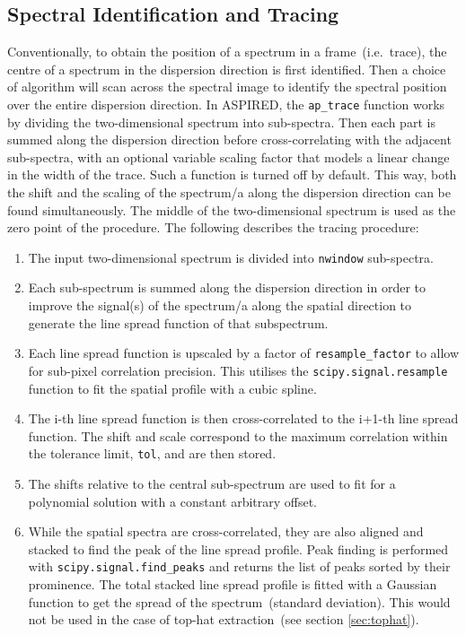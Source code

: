 \documentclass[linenumbers, twocolumn]{aastex631}
\begin{document}
\subsection{Spectral Identification and Tracing}
\label{sec:tracing}
Conventionally, to obtain the position of a spectrum in a frame~(i.e.\ trace),
the centre of a spectrum in the dispersion direction is first identified. Then
a choice of algorithm will scan across the spectral image to identify
the spectral position over the entire dispersion direction. In \textsc{ASPIRED},
the \texttt{ap\_trace} function works by dividing the two-dimensional spectrum
into sub-spectra. Then each part is summed along the dispersion direction
before cross-correlating with the adjacent sub-spectra, with an optional variable
scaling factor that models a linear change in the width of the trace. Such a
function is turned off by default. This way, both the shift and the scaling of
the spectrum/a along the dispersion direction can be found simultaneously. The
middle of the two-dimensional spectrum is used as the zero point of the
procedure. The following describes the tracing procedure:
\begin{enumerate}
    \item
        The input two-dimensional spectrum is divided into \texttt{nwindow}
        sub-spectra.
    \item
        Each sub-spectrum is summed along the dispersion direction
        in order to improve the signal(s) of the spectrum/a along
        the spatial direction to generate the line spread function
        of that subspectrum.
    \item
        Each line spread function is upscaled by a factor of
        \texttt{resample\_factor} to allow for sub-pixel correlation
        precision. This utilises the \texttt{scipy.signal.resample}
        function to fit the spatial profile with a cubic spline.
    \item
        The i-th line spread function is then cross-correlated to the i+1-th
        line spread function. The shift and scale correspond to the maximum
        correlation within the tolerance limit, \texttt{tol}, and are then stored.
    \item
        The shifts relative to the central sub-spectrum are used to
        fit for a polynomial solution with a constant arbitrary offset.
    \item
        While the spatial spectra are cross-correlated, they are also
        aligned and stacked to find the peak of the line spread profile.
        Peak finding is performed with \texttt{scipy.signal.find\_peaks}
        and returns the list of peaks sorted by their prominence. The
        total stacked line spread profile is fitted with a Gaussian
        function to get the spread of the spectrum~(standard deviation).
        This would not be used in the case of top-hat
        extraction~(see section \textsection\ref{sec:tophat}).
\end{enumerate}
\end{document}
